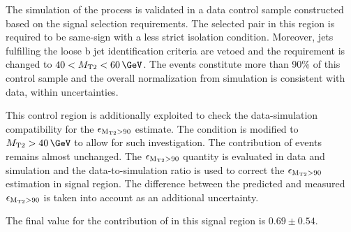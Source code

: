 The simulation of the \wjets process is validated in a data control sample constructed based on the \muTau signal selection requirements. The selected \muTau pair in this region is required to be same-sign with a less strict \Tau isolation condition. Moreover, jets fulfilling the loose b jet identification criteria are vetoed and the \mttwo requirement is changed to $40<\mttwo<60\,\GeV$. The \wjets events constitute more than 90\% of this control sample and the overall normalization from simulation is consistent with data, within uncertainties.

This control region is additionally exploited to check the data-simulation compatibility for the $\epsilon_{\rm M_{T2}>90}$ estimate. The \mttwo condition is modified to $\mttwo>40\,\GeV$ to allow for such investigation. The contribution of \wjets events remains almost unchanged. The $\epsilon_{\rm M_{T2}>90}$ quantity is evaluated in data and simulation and the data-to-simulation ratio is used to correct the $\epsilon_{\rm M_{T2}>90}$ estimation in signal region. The difference between the predicted and measured $\epsilon_{\rm M_{T2}>90}$ is taken into account as an additional uncertainty. 

The final value for the contribution of \wjets in this signal region is $0.69\pm0.54$.

